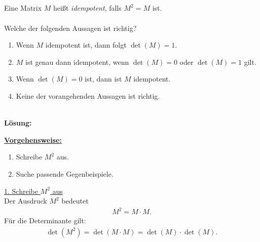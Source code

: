\subsection*{}
Eine Matrix $ M $ heißt \textit{idempotent}, falls $ M^2 = M $ ist.\\
\\
Welche der folgenden Aussagen ist richtig?
\renewcommand{\labelenumi}{(\alph{enumi})}
\begin{enumerate}
	\item 
	Wenn $ M $ idempotent ist, dann folgt $ \det(M) = 1 $.
	\item
	$ M $ ist genau dann idempotent, wenn $ \det(M) = 0 $ oder $ \det(M) = 1 $ gilt.
	\item
	Wenn $ \det(M) = 0 $ ist, dann ist $ M $ idempotent.
	\item
	Keine der vorangehenden Aussagen ist richtig.
\end{enumerate}
\ \\
\textbf{Lösung:}
\begin{mdframed}
\underline{\textbf{Vorgehensweise:}}
\renewcommand{\labelenumi}{\theenumi.}
\begin{enumerate}
\item Schreibe $ M^2 $ aus.
\item Suche passende Gegenbeispiele.
\end{enumerate}
\end{mdframed}

\underline{1. Schreibe $ M^2 $ aus}\\
Der Ausdruck $ M^2 $ bedeutet
\begin{align*}
M^2 = M \cdot M. 
\end{align*}
Für die Determinante gilt:
\begin{align*}
\det(M^2) = \det(M \cdot M) = \det(M) \cdot \det(M).
\end{align*}


